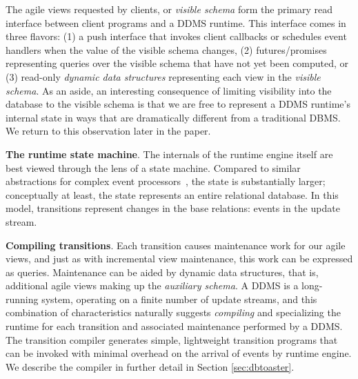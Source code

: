 The agile views requested by clients, or \textit{visible schema} form the
primary read interface between client programs and a DDMS runtime.  This
interface comes in three flavors: (1) a push interface that invokes client
callbacks or schedules event handlers when the value of the visible schema
changes, (2) futures/promises representing queries over the visible schema that
have not yet been computed, or (3) read-only \textit{dynamic data structures}
representing each view in the \textit{visible schema}.  As an aside, an
interesting consequence of limiting visibility into the database to the visible
schema is that we are free to represent a DDMS runtime's internal state in ways
that are dramatically different from a traditional DBMS.  We return to this
observation later in the paper.




{\bf The runtime state machine}\/.
The internals of the runtime engine itself are best viewed through the lens of a
state machine.  Compared to similar abstractions for complex event
processors~\cite{agrawal-sigmod:08, demers-sigmod:07}, the state is
substantially larger; conceptually at least, the state represents an entire
relational database.  In this model, transitions represent changes in the base
relations: events in the update stream.



{\bf Compiling transitions}\/.
Each transition causes maintenance work for our agile views, and just as
with incremental view maintenance, this work can be expressed as queries.
Maintenance can be aided by dynamic data structures, that is, additional agile
views making up the \textit{auxiliary schema}.
A DDMS is a long-running system, operating on a finite number of update streams,
and this combination of characteristics naturally suggests \textit{compiling}
and specializing the runtime for each transition and associated maintenance
performed by a DDMS. The transition compiler generates simple, lightweight
transition programs that can be invoked with minimal overhead on the arrival of
events by runtime engine. We describe the compiler in further detail in Section
\ref{sec:dbtoaster}.







